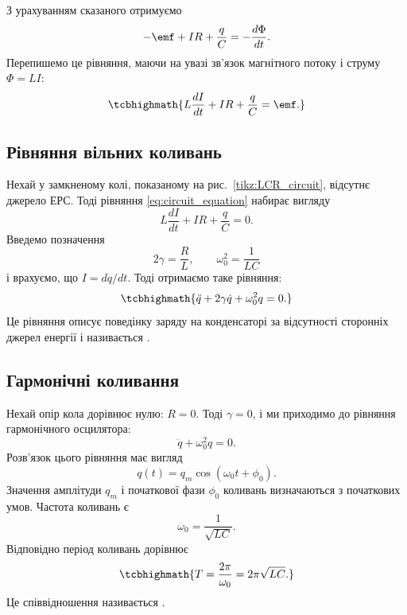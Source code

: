 З урахуванням сказаного отримуємо
\begin{equation}\label{eq:circuit_equation_raw}
	-\emf + IR + \frac{q}{C} = -\frac{d\Phi}{dt}.
\end{equation}
Перепишемо це рівняння, маючи на увазі зв'язок магнітного потоку і струму
$\Phi = LI$:
\begin{equation}\label{eq:circuit_equation}
	\tcbhighmath{
		L\frac{dI}{dt} + IR + \frac{q}{C} = \emf.
	}
\end{equation}

\subsection*{Рівняння вільних коливань}

Нехай у замкненому колі, показаному на рис.~\ref{tikz:LCR_circuit}, відсутнє
джерело ЕРС. Тоді рівняння \eqref{eq:circuit_equation} набирає вигляду
\begin{equation}\label{eq:free_oscillation_raw}
	L\frac{dI}{dt} + IR + \frac{q}{C} = 0.
\end{equation}
Введемо позначення
\begin{equation}\label{eq:definitions}
	2\gamma = \frac{R}{L}, \qquad \omega_0^2 = \frac{1}{LC}
\end{equation}
і врахуємо, що $I = dq/dt$. Тоді отримаємо таке рівняння:
\begin{equation}\label{eq:free_oscillation}
	\tcbhighmath{
		\ddot{q} + 2\gamma\dot{q} + \omega_0^2 q = 0.
	}
\end{equation}
Це рівняння описує поведінку заряду на конденсаторі за
відсутності сторонніх джерел енергії і називається .

\subsection*{Гармонічні коливання}

Нехай опір кола дорівнює нулю: $R = 0$. Тоді $\gamma = 0$, і ми
приходимо до рівняння гармонічного осцилятора:
\begin{equation}\label{eq:harmonic_equation}
	\ddot{q} + \omega_0^2 q = 0.
\end{equation}
Розв'язок цього рівняння має вигляд
\begin{equation}\label{eq:harmonic_solution}
	q(t) = q_m \cos(\omega_0 t + \phi_0).
\end{equation}
Значення амплітуди $q_m$ і початкової фази $\phi_0$ коливань визначаються
з початкових умов. Частота коливань є
\begin{equation}\label{eq:frequency}
	\omega_0 = \frac{1}{\sqrt{LC}}.
\end{equation}
Відповідно період коливань дорівнює
\begin{equation}\label{eq:Thomson_formula}
	\tcbhighmath{
		T = \frac{2\pi}{\omega_0} = 2\pi\sqrt{LC}.
	}
\end{equation}
Це співвідношення називається .

